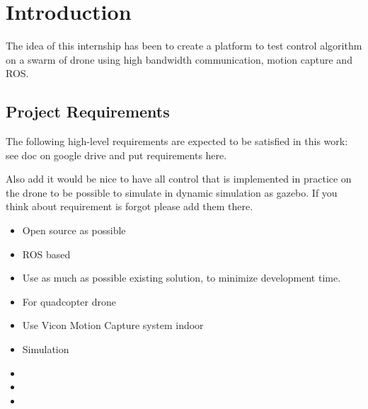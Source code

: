 \chapter{Introduction}

The idea of this internship has been to create a platform to test control algorithm on a swarm of drone using high bandwidth communication, motion capture and ROS.





\section{Project Requirements}
The following high-level requirements are expected to be satisfied in this work: see doc on google drive and put requirements here.

Also add it would be nice to have all control that is implemented in practice on the drone to be possible to simulate in dynamic simulation as gazebo. If you think about requirement is forgot please add them there.
\begin{itemize}
    \item Open source as possible
    \item ROS based
    \item Use as much as possible existing solution, to minimize development time.
    \item For quadcopter drone
    \item Use Vicon Motion Capture system indoor
    \item Simulation
    \item
    \item
    \item
\end{itemize}
